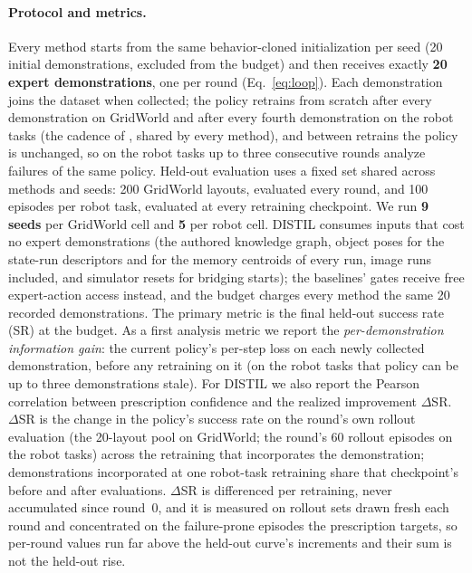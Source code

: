 \documentclass[letterpaper]{article} %
\begin{document}
\paragraph{Protocol and metrics.}
Every method starts from the same behavior-cloned initialization per seed
(20 initial demonstrations, excluded from the budget) and then receives
exactly \textbf{20 expert demonstrations}, one per round
(Eq.~\ref{eq:loop}). Each demonstration joins the dataset when collected;
the policy retrains from scratch after every demonstration on GridWorld and
after every fourth demonstration on the robot tasks (the cadence of
\citealp{lee2025diffdagger}, shared by every method), and between retrains
the policy is unchanged, so on the robot tasks up to three consecutive
rounds analyze failures of the same policy. Held-out evaluation uses a
fixed set shared across methods and seeds: 200 GridWorld layouts, evaluated
every round, and 100 episodes per robot task, evaluated at every
retraining checkpoint. We run \textbf{9 seeds} per
GridWorld cell and \textbf{5} per robot cell. DISTIL consumes inputs that
cost no expert demonstrations (the authored knowledge graph, object poses
for the state-run descriptors and for the memory centroids of every run,
image runs included, and simulator resets for bridging starts); the
baselines' gates receive free expert-action access instead, and the budget
charges every method the same 20 recorded demonstrations.
The primary metric is the final held-out success
rate (SR) at the budget. As a first analysis metric we report the
\emph{per-demonstration information gain}: the current policy's per-step
loss on each newly collected demonstration, before any retraining on it
(on the robot tasks that policy can be up to three demonstrations stale).
For DISTIL we also report the Pearson correlation between prescription
confidence and the realized improvement $\Delta$SR. $\Delta$SR is the
change in the policy's success rate on the round's own rollout evaluation
(the 20-layout pool on GridWorld; the round's 60 rollout episodes on the
robot tasks) across the retraining that incorporates the demonstration;
demonstrations incorporated at one robot-task retraining share that
checkpoint's before and after evaluations. $\Delta$SR is differenced per
retraining, never accumulated since round~0, and it is measured on rollout
sets drawn fresh each round and concentrated on the failure-prone episodes
the prescription targets, so per-round values run far above the held-out
curve's increments and their sum is not the held-out rise.
\end{document}
